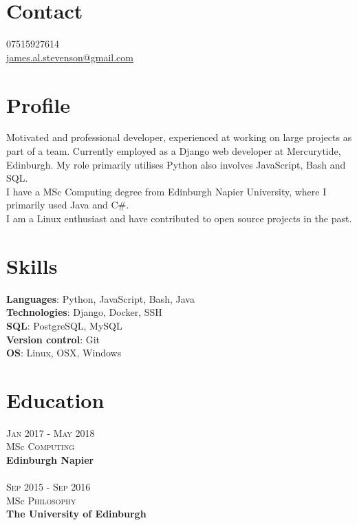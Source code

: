 \documentclass[14pt, a4paper]{extarticle}
\begin{document}
\par{\bigskip\par
\section{Contact}
\large
07515927614\\
\href{mailto:james.al.stevenson@gmail.com}{james.al.stevenson@gmail.com}\\
}

\begin{multicols}{2}

\section{Profile}
\noindent Motivated and professional developer, experienced at working on large projects as part of a team. Currently employed as a Django web developer at Mercurytide, Edinburgh. My role primarily utilises Python also involves JavaScript, Bash and SQL.\\
I have a MSc Computing degree from Edinburgh Napier University, where I primarily used Java and C\#.\\
I am a Linux enthusiast and have contributed to open source projects in the past.

\section{Skills}
\noindent\textbf{Languages}: Python, JavaScript, Bash, Java\\
\textbf{Technologies}: Django, Docker, SSH\\
\textbf{SQL}: PostgreSQL, MySQL\\
\textbf{Version control}: Git\\
\textbf{OS}: Linux, OSX, Windows

\section{Education}
\noindent\textsc{Jan} 2017 - \textsc{May} 2018\\
MSc \textsc{Computing} \\
\textbf{Edinburgh Napier}\\~\\
\textsc{Sep} 2015 - \textsc{Sep} 2016\\
MSc \textsc{Philosophy} \\ 
\textbf{The University of Edinburgh}


\end{multicols}
\end{document}
